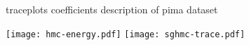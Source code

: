 traceplots
coefficients
description of pima dataset

\texttt{[image: hmc-energy.pdf]}
\texttt{[image: sghmc-trace.pdf]}
